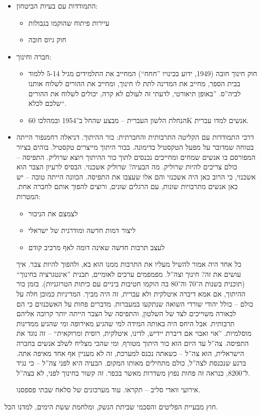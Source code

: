 \documentclass[]{../../../../tex/classes/styledArticle}
\begin{document}
\begin{itemize}
\begin{itemize}
			\item עבודות יזומות – מצד אחד, עוזרות לפתח את המדינה, ומצד שני, נותנת פרנסה מינימלית ובסיסית לאנשים שאין להם עבודה. 
		\end{itemize}
		\item התמודדות עם בעיות הביטחון: 
		\begin{itemize}
			\item עיירות פיתוח שהוקמו בגבולות
			\item חוק גיוס חובה
		\end{itemize}
		\item חברה וחינוך: 
		\begin{itemize}
			\item חוק חינוך חובה (1949, ידוע בכינויו ''חחח``) המחייב את התלמידים מגיל 5-14 ללמוד בבית הספר, מחייב את המדינה לתת לו חינוך, ומחייב את ההורים לשלוח אותנו לביה''ס. ''באופן תיאורטי, לדעתי זה לעולם לא קרה, יכולים לשלוח את ההורים שלכם לכלא``. 
			\item הנחלת הלשון העברית – מבצע שהחל ב־1954 ובמהלכו 60K אנשים למדו עברית. 
		\end{itemize}
		\item דרכי התמודדות עם הקליטה התרבותית והחברתית: כור ההיתוך. דניאלה רחמנפור הייתה בטוחה שמדובר על מפעל הטקסטיל בדימונה. בכור היתוך מייצרים טקסטיל. בוהים בציור המפורסם בו אנשים שמחים ומחייכים נכנסים לתוך כור ההיתוך ויוצא שרוליק. התפיסה – כולם צריכים להיות שרוליק. מה הבעיה? שרוליק אשכנזי. הבסיס לרעיון הצבר הוא אשכנזי, כי הרוב כאן היה אשכנזי והם אלו שעצבו את התפיסה. הכוונה הייתה טובה – יש כאן אנשים מתרבויות שונות, עם הרגלים שונים, ורוצים להפוך אותם לחברה אחת. המטרות: 
		\begin{itemize}
			\item לצמצם את הניכור
			\item ליצור דמות חדשה ומודרנית של ישראלי
			\item לעצב תרבות חדשה שאינה דומה לאף מרכיב קודם
		\end{itemize}
		כל אחד היה אמור להשיל מעליו את התרבות ממנו הוא בא, ולהפוך להיות צבר. איך עושים את זה? חינוך וצה''ל. מפמפמים ערכים לאומיים, תכנית ''אינטגרציה בחינוך`` (תוכנית בשנות ה־70 וה־80 בה הוקמו חטיבות ביניים עם כיתות הטרוגניות). בזמן כור ההיתוך, אם אמא דיברה איטלקית ולא עברית, זה היה מביך. המדיניות כמובן חלה על כולם – כולל יהודי שורדי השואה שנתקעו במעברות. מדברים פחות על האשכנזים כי הם לכאורה משוייכים לצד של השלטון, והתפיסה של הצבר הייתה יותר קרובה אליהם תרבותית. אבל היחס היה באותה המידה למי שהגיע מאירופה ומי שהגיע ממדינות מוסלמיות. ''אוי ואבוי אם דיברת יידיש, לדינו, איטלקית, רוסית ומרוקאית`` – זה נוגד את התפיסה. צה''ל עד היום הוא כור היתוך מטורף, ומי שהכי מצליח לשלב אנשים בחברה הישראלית, הוא צה''ל – כשאתה נכנס למערכת, זה לא מעניין אף אחד מאיפה אתה. ברגע שנכנסת לצה''ל, כולם מתחילים מאותו המקום. הבעיה היא לפני צה''ל – כי נגיד ל־8200, כנראה זה פחות נפוץ משדרות מאשר בכפר. זה קשור בחינוך לפני, לא בצה''ל. 
		
		אירועי וואדי סליב – תקראו. עוד מערכונים של סלאח שבתי פספסנו. 
	\end{itemize}
	
	חוץ מבעיית הפליטים והסכמי שביתת הנשק, ומלחמת ששת הימים, למדנו הכל. 
	
	
\end{document}
